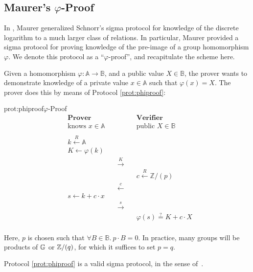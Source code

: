 \subsection{Maurer's \texorpdfstring{$\varphi$}{varphi}-Proof}
\label{sec:maurer}

In \cite{maurer_unifying_2009}, Maurer generalized Schnorr's sigma 
protocol for knowledge of the discrete logarithm \cite{schnorr_efficient_1990} to a much larger class
of relations. In particular, Maurer provided a sigma protocol for
proving knowledge of the pre-image of a group homomorphism $\varphi$.
We denote this protocol as a ``$\varphi$-proof'', and recapitulate the scheme
here.

Given a homomorphism $\varphi : \mathbb{A} \to \mathbb{B}$, and a public value
$X \in \mathbb{B}$, the prover wants to demonstrate knowledge of a private
value $x \in \mathbb{A}$ such that $\varphi(x) = X$. The prover
does this by means of Protocol \ref{prot:phiproof}:

\begin{aprotocol}{prot:phiproof}{$\varphi$-Proof}
\[
\begin{aligned}
    &\textbf{Prover}&&\textbf{Verifier}\\
    &\text{knows } x \in \mathbb{A}&&\text{public } X \in \mathbb{B}\\
    \\
    &k \xleftarrow{R} \mathbb{A}&\\
    &K \gets \varphi(k)&\\
    &&\quad\overset{K}{\longrightarrow}\quad\\
    &&&c \xleftarrow{R} \mathbb{Z}/(p)\\
    &&\quad\overset{c}{\longleftarrow}\quad\\
    &s \gets k + c \cdot x\\
    &&\quad\overset{s}{\longrightarrow}\quad\\
    &&& \varphi(s) \overset{?}{=} K + c \cdot X\\
\end{aligned}
\]
\end{aprotocol}

Here, $p$ is chosen such that $\forall B \in \mathbb{B}.\ p \cdot B = 0$.
In practice, many groups will be products of $\mathbb{G}$ or $\mathbb{Z}/(q)$,
for which it suffices to set $p = q$.

\begin{claim}
    Protocol \ref{prot:phiproof} is a valid sigma protocol,
    in the sense of~\cite{damgard_sigma-protocols_2002}.
\end{claim}

